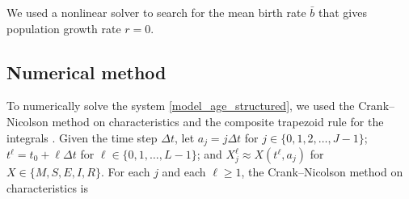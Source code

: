 \documentclass{jpmarticle}
\begin{document}
We used a nonlinear solver to search for the mean birth rate $\bar{b}$
that gives population growth rate $r = 0$.


\subsection{Numerical method}

To numerically solve the system
\eqref{model_age_structured}, we used the Crank--Nicolson
method on characteristics and the composite trapezoid rule for the
integrals \autocite{milner_1992}.  Given the time step $\Delta t$,
let $a_j = j \Delta t$ for $j \in \{0, 1, 2, \ldots, J - 1\}$;
$t^{\ell} = t_0 + \ell \Delta t$ for
$\ell \in \{0, 1, \ldots, L - 1\}$; and
$X_j^{\ell} \approx X(t^{\ell}, a_j)$ for $X \in \{M, S, E, I, R\}$.
For each $j$ and each $\ell \geq 1$, the Crank--Nicolson method on
characteristics is
\end{document}
